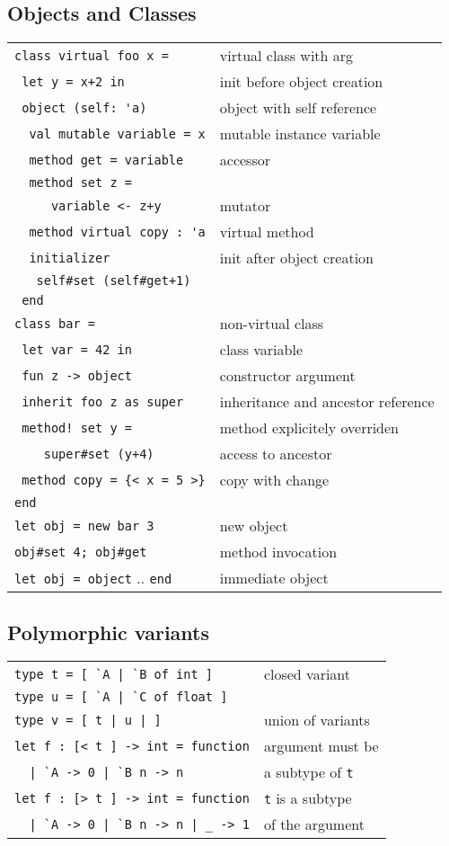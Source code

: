 \documentclass[10pt,landscape]{article}
\begin{document}
\begin{multicols}{3}
\subsection{Objects and Classes}

\begin{tabular}{ll}
\verb!class virtual foo x = !& virtual class with arg \\
\verb! let y = x+2 in! & init before object creation\\
\verb! object (self: 'a)! & object with self reference\\
\verb!  val mutable variable = x! & mutable instance variable \\
\verb!  method get = variable! & accessor \\
\verb!  method set z =!\\
\verb!     variable <- z+y! & mutator\\
\verb!  method virtual copy : 'a! & virtual method\\
\verb!  initializer! & init after object creation\\
\verb!   self#set (self#get+1)!& \\
\verb! end! &  \\
\verb!class bar = !&  non-virtual class\\
\verb! let var = 42 in! & class variable\\
\verb! fun z -> object! & constructor argument \\
\verb& inherit foo z as super& & inheritance and ancestor reference\\
\verb& method! set y =& & method explicitely overriden\\
\verb!    super#set (y+4)! & access to ancestor \\
\verb! method copy = {< x = 5 >}! & copy with change \\
\verb!end! & \\
\verb!let obj = new bar 3! & new object \\
\verb!obj#set 4; obj#get!  & method invocation \\
\verb!let obj = object! .. \verb!end! & immediate object \
\end{tabular}

\subsection{Polymorphic variants}


\begin{tabular}{ll}
\verb!type t = [ `A | `B of int ]! & closed variant \\
\verb!type u = [ `A | `C of float ]! & \\
\verb!type v = [ t | u | ]! & union of variants \\
\verb!let f : [< t ] -> int = function! & argument must be\\
\verb!  | `A -> 0 | `B n -> n! & \hfill a subtype of \verb!t!\\
\verb!let f : [> t ] -> int = function! & \verb!t! is a subtype \\
\verb!  | `A -> 0 | `B n -> n | _ -> 1! & \hfill of the argument \\
\end{tabular}

\end{multicols}
\end{document}
